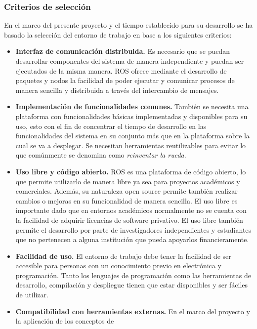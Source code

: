         \subsubsection{Criterios de selección}
        En el marco del presente proyecto y el tiempo establecido para su desarrollo se ha basado la selección del entorno 
        de trabajo en base a los siguientes criterios:
        \begin{itemize}
            \item \textbf{Interfaz de comunicación distribuida.} Es necesario que se puedan desarrollar componentes del sistema 
            de manera independiente y puedan ser ejecutados de la misma manera. ROS ofrece mediante el desarrollo de 
            paquetes y nodos la facilidad de poder ejecutar y comunicar procesos de manera sencilla y distribuida a través
             del intercambio de mensajes.
            \item \textbf{Implementación de funcionalidades comunes.} También se necesita una plataforma con funcionalidades básicas 
            implementadas y disponibles para su uso, esto con el fin de concentrar el tiempo de desarrollo en las funcionalidades del 
            sistema en su conjunto más que en la plataforma sobre la cual se va a desplegar. Se necesitan herramientas reutilizables 
            para evitar lo que comúnmente se denomina como \textit{reinventar la rueda}.
            \item \textbf{Uso libre y código abierto.} ROS es una plataforma de código abierto, lo que permite utilizarlo de manera 
            libre ya sea para proyectos académicos y comerciales. Además, su naturaleza open source permite también realizar cambios 
            o mejoras en su funcionalidad de manera sencilla. El uso libre es importante dado que en entornos académicos normalmente 
            no se cuenta con la facilidad de adquirir licencias de software privativo. El uso libre también permite el desarrollo por 
            parte de investigadores independientes y estudiantes que no pertenecen a alguna institución que pueda apoyarlos financieramente.
            \item \textbf{Facilidad de uso.} El entorno de trabajo debe tener la facilidad de ser accesible para personas con un 
            conocimiento previo en electrónica y programación. Tanto los lenguajes de programación como las herramientas de desarrollo, 
            compilación y despliegue tienen que estar disponibles y ser fáciles de utilizar.
            \item \textbf{Compatibilidad con herramientas externas.} En el marco del proyecto y la aplicación de los conceptos de 

\end{itemize}
